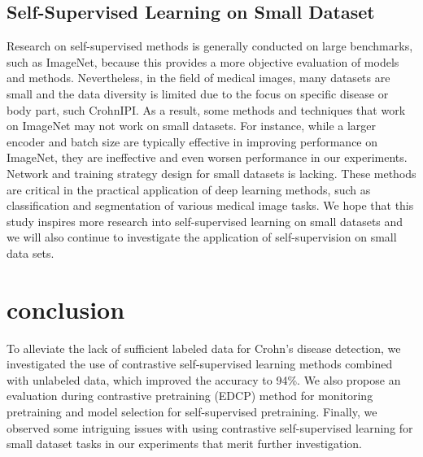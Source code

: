\documentclass[conference]{IEEEtran}
\begin{document}
\subsection{Self-Supervised Learning on Small Dataset}
Research on self-supervised methods is generally conducted on large benchmarks, such as ImageNet, because this provides a more objective evaluation of models and methods.
Nevertheless, in the field of medical images, many datasets are small and the data diversity is limited due to the focus on specific disease or body part, such CrohnIPI. 
As a result, some methods and techniques that work on ImageNet may not work on small datasets.
For instance, while a larger encoder and batch size are typically effective in improving performance on ImageNet, they are ineffective and even worsen performance in our experiments.
Network and training strategy design for small datasets is lacking. These methods are critical in the practical application of deep learning methods, such as classification and segmentation of various medical image tasks. We hope that this study inspires more research into self-supervised learning on small datasets and we will also continue to investigate the application of self-supervision on small data sets.

\section{conclusion}
To alleviate the lack of sufficient labeled data for Crohn's disease detection, we investigated the use of contrastive self-supervised learning methods combined with unlabeled data, which improved the accuracy to 94\%.  We also propose an evaluation during contrastive pretraining (EDCP) method for monitoring pretraining and model selection for self-supervised pretraining. Finally, we observed some intriguing issues with using contrastive self-supervised learning for small dataset tasks in our experiments that merit further investigation.





\end{document}
